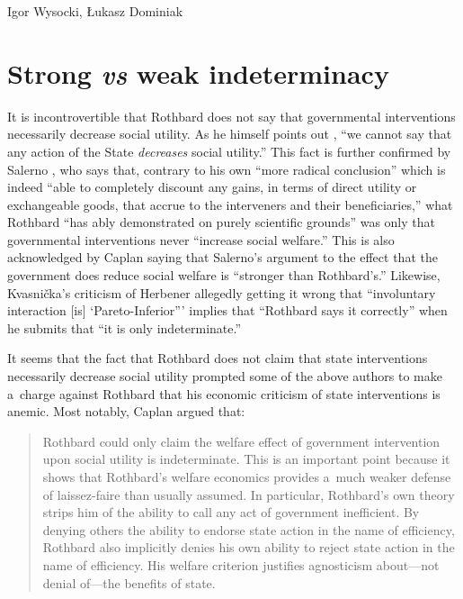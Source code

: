 \begin{artengenv}{Igor Wysocki, Łukasz Dominiak}
\section{Strong \textit{vs} weak indeterminacy}

It is incontrovertible that Rothbard does not say that governmental interventions necessarily decrease social utility. As he himself points out 
\parencite[][p.100]{rothbard_praxeology_1976}, %
 ``we cannot say that any action of the State \textit{decreases} social utility.'' This fact is further confirmed by Salerno 
\parencite*[][p.131]{salerno_mises_1993}, %
 who says that, contrary to his own ``more radical conclusion'' which is indeed ``able to completely discount any gains, in terms of direct utility or exchangeable goods, that accrue to the interveners and their beneficiaries,'' what Rothbard ``has ably demonstrated on purely scientific grounds'' was only that governmental interventions never ``increase social welfare.'' 
\parencite[][p.131]{salerno_mises_1993} %
 This is also acknowledged by Caplan 
\parencite*[][p.833]{caplan_austrian_1999} %
 saying that Salerno's argument to the effect that the government does reduce social welfare is ``stronger than Rothbard's.'' Likewise, Kvasnička's 
\parencite*[][p.49]{kvasnicka_rothbards_2008} %
 criticism of Herbener 
\parencite*[][pp.103–104]{herbener_pareto_1997} %
 allegedly getting it wrong that ``involuntary interaction [is] ‘Pareto-Inferior''' implies that ``Rothbard says it correctly'' when he submits that ``it is only indeterminate.'' 
\parencite[][p.49]{kvasnicka_rothbards_2008}%




It seems that the fact that Rothbard does not claim that state interventions necessarily decrease social utility prompted some of the above authors to make a~charge against Rothbard that his economic criticism of state interventions is anemic. Most notably, Caplan 
\parencite*[][p.834]{caplan_austrian_1999} %
 argued that:



\begin{quote}
Rothbard could only claim the welfare effect of government intervention upon social utility is indeterminate. This is an important point because it shows that Rothbard's welfare economics provides a~much weaker defense of laissez-faire than usually assumed. In particular, Rothbard's own theory strips him of the ability to call any act of government inefficient. By denying others the ability to endorse state action in the name of efficiency, Rothbard also implicitly denies his own ability to reject state action in the name of efficiency. His welfare criterion justifies agnosticism about---not denial of---the benefits of state.
\end{quote}




\end{artengenv}
